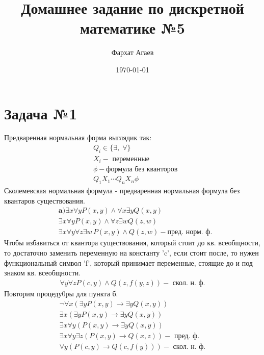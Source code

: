\documentclass[a4paper,12pt]{article} %
\author{Фархат Агаев}
\title{Домашнее задание по дискретной математике №5}
\date{\today}
\begin{document}

\maketitle
\section*{Задача №1}
Предваренная нормальная форма выглядик так:
\begin{align*} 
    &Q_i \in \{\exists, \; \forall\} \\
    &X_i - \text{ переменные} \\
    &\phi - \text{формула без кванторов} \\
    &Q_1 X_1 \cdots Q_n X_n\phi
\end{align*}
Сколемевская нормальная формула - предваренная нормальная формула 
без квантаров существования.
\begin{align*}
    &\textbf{a)} \exists x \forall y P(x, y) \wedge \forall x \exists y Q(x, y) \\
    &\exists x \forall y P(x, y) \wedge \forall z \exists w Q(z, w) \\
    &\exists x \forall y \forall z \exists w  \, P(x, y) \wedge Q(z, w) - \text{пред. норм. ф.}
\end{align*}
Чтобы избавиться от квантора существования, который стоит до кв. всеобщности,
то достаточно заменить переменную на константу 'c', если стоит после,
то нужен функциональный символ 'f', который принимает переменные, стоящие до и под знаком кв. всеобщности.
\begin{align*}
    \forall y \forall z P(c, y) \wedge Q(z, f(y, z)) -\text{ скол. н. ф.}
\end{align*} 
Повторим процеду0ры для пункта б.
\\
\begin{align*}
    \neg \forall x (\exists y P(x, y) \rightarrow \exists y Q(x, y)) \\
    \exists x (\exists y P(x, y) \rightarrow \exists y Q(x, y)) \\
    \exists x \forall y (P(x, y) \rightarrow \exists y Q(x, y)) \\
    \exists x \forall y \exists z(P(x, y) \rightarrow  Q(x, z)) - \text{ пред. ф.} \\
    \forall y(P(c, y) \rightarrow  Q(c, f(y))) - \text{ скол. н. ф.}
\end{align*}
\end{document}
